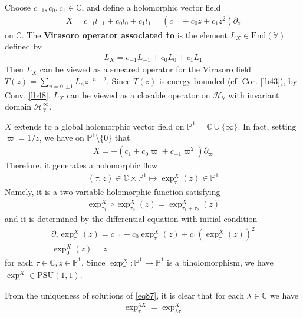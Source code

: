 \documentclass[12pt,b5paper,notitlepage]{article}
\theoremstyle{definition}
\theoremstyle{plain}
\newcommand{\End}{\mathrm{End}} %
\newcommand{\PSU}{\mathrm{PSU}(1,1)}
\newcommand{\Vbb}{\mathbb V}
\newcommand{\Cbb}{\mathbb C}
\newcommand{\Pbb}{\mathbb P}
\newcommand{\HV}{\mathcal H_{\mathbb V}}
\numberwithin{equation}{section}
\begin{document}
Choose $c_{-1},c_0,c_1\in\Cbb$, and define a holomorphic vector field
\begin{align}\label{eq83}
X=c_{-1}l_{-1}+c_0l_0+c_1l_1=(c_{-1}+c_0z+c_1z^2)\partial_z
\end{align}
on $\Cbb$. The \textbf{Virasoro operator associated to } is the element $L_X\in\End(\Vbb)$ defined by 
\begin{align}
L_X=c_{-1}L_{-1}+c_0L_0+c_1L_1
\end{align}
Then $L_X$ can be viewed as a smeared operator for the Virasoro field $T(z)=\sum_{n=0,\pm1}L_nz^{-n-2}$. Since $T(z)$ is energy-bounded (cf. Cor. \ref{lb43}), by Conv. \ref{lb48}, $L_X$ can be viewed as a closable operator on $\HV$ with invariant domain $\HV^\infty$.



$X$ extends to a global holomorphic vector field on $\Pbb^1=\Cbb\cup\{\infty\}$. In fact, setting $\varpi=1/z$, we have on $\Pbb^1\setminus\{0\}$ that
\begin{align}\label{eqb7}
X=-(c_1+c_0\varpi+c_{-1}\varpi^2)\partial_\varpi
\end{align}
Therefore, it generates a holomorphic flow 
\begin{align}
(\tau,z)\in\Cbb\times\Pbb^1\mapsto \exp^X_\tau(z)\in\Pbb^1
\end{align}
Namely, it is a two-variable holomorphic function satisfying
\begin{align}\label{eq100}
\exp^X_{\tau_1}\circ\exp^X_{\tau_2}(z)=\exp^X_{\tau_1+\tau_2}(z)
\end{align}
and it is determined by the differential equation with initial condition
\begin{subequations}\label{eq87}
\begin{gather}
\partial_\tau\exp^X_\tau(z)=c_{-1}+c_0\exp^X_\tau(z)+c_1(\exp^X_\tau(z))^2\label{eq87a}\\
\exp_0^X(z)=z
\end{gather}
\end{subequations}
for each $\tau\in\Cbb,z\in\Pbb^1$. Since $\exp_\tau^X:\Pbb^1\rightarrow\Pbb^1$ is a biholomorphism, we have $\exp_\tau^X\in\PSU$. 


From the uniqueness of solutions of \eqref{eq87}, it is clear that for each $\lambda\in\Cbb$ we have
\begin{align}
\exp^{\lambda X}_\tau=\exp^X_{\lambda\tau}
\end{align}
\end{document}
